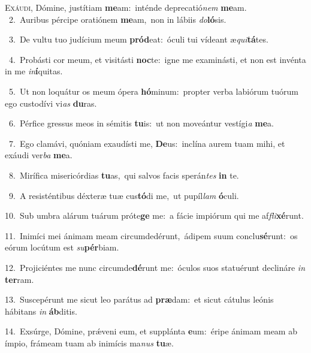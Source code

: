 \lettrine{\initial\textcolor{\initialcolor}{E}}{xáudi,} Dómine, justítiam \textbf{me}\-am:~\star inténde deprecatió\textit{nem} \textbf{me}\-am.\\
{\numbfont\textcolor{\numbcolor}{~2.}}~Auribus pércipe oratiónem \textbf{me}\-am,~\star non in lábiis \textit{do}\-\textbf{ló}sis.\par
{\numbfont\textcolor{\numbcolor}{~3.}}~De vultu tuo judícium meum \textbf{pród}\-eat:~\star óculi tui vídeant æ\-\textit{qui}\-\textbf{tá}tes.\par
{\numbfont\textcolor{\numbcolor}{~4.}}~Probásti cor meum, et visitásti \textbf{noc}\-te:~\star igne me examinásti, et non est invénta in me \textit{in}\-\textbf{í}quitas.\par
{\numbfont\textcolor{\numbcolor}{~5.}}~Ut non loquátur os meum ópera \textbf{hó}\-minum:~\star propter verba labiórum tuórum ego custodívi vi\textit{as} \textbf{du}\-ras.\par
{\numbfont\textcolor{\numbcolor}{~6.}}~Pérfice gressus meos in sémitis \textbf{tu}\-is:~\star ut non moveántur vestígi\textit{a} \textbf{me}\-a.\par
{\numbfont\textcolor{\numbcolor}{~7.}}~Ego clamávi, quóniam exaudísti me, \textbf{De}\-us:~\star inclína aurem tuam mihi, et exáudi ver\textit{ba} \textbf{me}\-a.\par
{\numbfont\textcolor{\numbcolor}{~8.}}~Mirífica misericórdias \textbf{tu}\-as,~\star qui salvos facis sperán\textit{tes} \textbf{in} te.\par
{\numbfont\textcolor{\numbcolor}{~9.}}~A resisténtibus déxteræ tuæ cus\-\textbf{tó}\-di me,~\star ut pupíl\textit{lam} \textbf{ó}\-culi.\par
{\numbfont\textcolor{\numbcolor}{10.}}~Sub umbra alárum tuárum próte\textbf{ge} me:~\star a fácie impiórum qui me af\-\textit{fli}\-\textbf{xé}runt.\par
{\numbfont\textcolor{\numbcolor}{11.}}~Inimíci mei ánimam meam circumdedérunt,~\dagger ádipem suum conclu\-\textbf{sé}\-runt:~\star os eórum locútum est \textit{su}\-\textbf{pér}biam.\par
{\numbfont\textcolor{\numbcolor}{12.}}~Projiciéntes me nunc circumde\-\textbf{dé}\-runt me:~\star óculos suos statuérunt declináre \textit{in} \textbf{ter}\-ram.\par
{\numbfont\textcolor{\numbcolor}{13.}}~Suscepérunt me sicut leo parátus ad \textbf{præ}\-dam:~\star et sicut cátulus leónis hábitans \textit{in} \textbf{áb}\-ditis.\par
{\numbfont\textcolor{\numbcolor}{14.}}~Exsúrge, Dómine, prǽveni eum, et supplánta \textbf{e}\-um:~\star éripe ánimam meam ab ímpio, frámeam tuam ab inimícis ma\textit{nus} \textbf{tu}\-æ.\par
